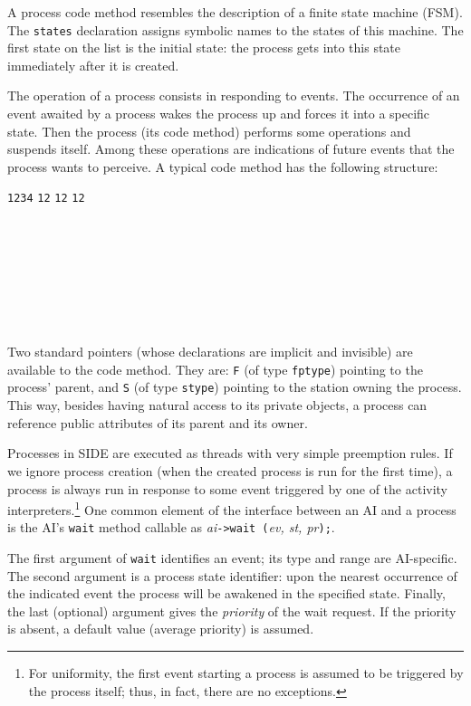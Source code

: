 A process code method resembles the description of a finite
state machine (FSM).
The {\tt states}
declaration assigns symbolic names to the states of this machine.
The first state on the list is the initial state: the process gets into this
state immediately after it is created.

The operation of a process consists in responding to events.
The occurrence of an event awaited by a process wakes the process up and
forces it into a specific state.
Then the process (its code method) performs some operations and suspends
itself.
Among these operations are indications of future
events that the process wants to perceive.
A typical code method has the following structure:

{\small\begin{tabbing}
{\tt 1234} \= {\tt 12} \= {\tt 12} \= {\tt 12} \kill
{}\\
\>\\
\>\>\>{\em \ldots}\\
\>\\
\>\>\>{\em \ldots}\\
\>\>{\em \ldots}\\
\>\\
\>\>\>{\em \ldots}\\
\>{\tt \};}
\end{tabbing}}

Two standard pointers (whose declarations are implicit and invisible)
are available to the code method.
They are: {\tt F} (of type {\tt fptype})
pointing to the process' parent,
and {\tt S} (of type {\tt stype}) pointing to the station owning the
process.
This way, besides having natural access to its private objects, a process can
reference public attributes of its parent and its owner.

Processes in SIDE are executed as threads with very simple preemption rules.
If we ignore process creation (when the created process is run for the first
time), a process is always run in response to some event triggered by
one of the activity interpreters.\footnote{For uniformity, the first event
starting a process is assumed to be triggered by the process itself; thus,
in fact, there are no exceptions.}
One common element of the interface between an AI and a process
is the AI's {\tt wait} method callable as
{\em ai\/}{\tt ->wait (}{\em ev, st, pr\/}{\tt );}.

The first argument of {\tt wait}
identifies an event; its type and range are AI-specific.
The second argument is a process state identifier: upon the nearest occurrence
of the indicated event the process will be awakened in the specified state.
Finally, the last (optional)
argument gives the {\em priority\/} of the wait request.
If the priority is absent, a default value (average priority) is assumed.

